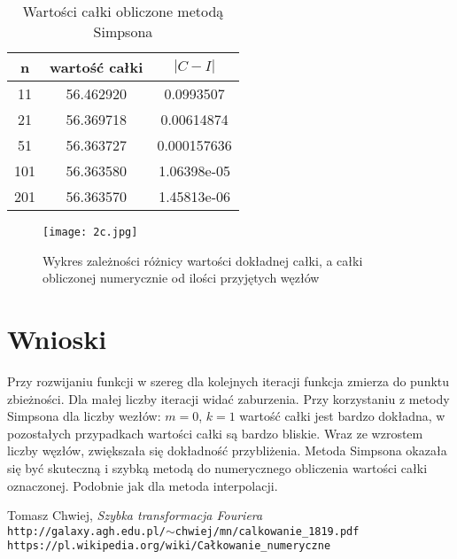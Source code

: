 \documentclass{article}
\begin{document}
\begin{table}[H]
\centering
\begin{tabular}{|c|c|c|}
n& wartość całki &  $|C−I|$  \\
\hline
11 & 56.462920 & 0.0993507\\ 
21 & 56.369718 & 0.00614874\\ 
51  & 56.363727 & 0.000157636\\ 
101  & 56.363580 & 1.06398e-05\\ 
201  & 56.363570 &  1.45813e-06
\end{tabular}
\caption{Wartości całki obliczone metodą Simpsona}
\end{table}

\begin{figure}[H]
\begin{center}
\texttt{[image: 2c.jpg]}
\caption{Wykres zależności różnicy wartości dokładnej całki, a całki obliczonej numerycznie od ilości przyjętych
węzłów}
\label{pierwszy} 
\end{center}
\end{figure}



\section{Wnioski}
Przy rozwijaniu funkcji w szereg dla kolejnych iteracji funkcja zmierza do punktu zbieżności. Dla małej liczby iteracji widać zaburzenia. Przy korzystaniu z metody Simpsona dla liczby wezłów: $m=0$, $k=1$ wartość całki jest bardzo dokładna, w pozostałych przypadkach wartości całki są bardzo bliskie. Wraz ze wzrostem liczby węzłów, zwiększała się dokładność przybliżenia. Metoda Simpsona okazała się być skuteczną i szybką metodą do numerycznego obliczenia wartości całki oznaczonej. Podobnie jak dla metoda interpolacji.

\begin{thebibliography}{1}

	Tomasz Chwiej, \emph{Szybka transformacja Fouriera} \\
	\texttt{http://galaxy.agh.edu.pl/$\sim$chwiej/mn/calkowanie\_1819.pdf}	
	\texttt{https://pl.wikipedia.org/wiki/Całkowanie\_numeryczne}
	

\end{thebibliography}
\end{document}

